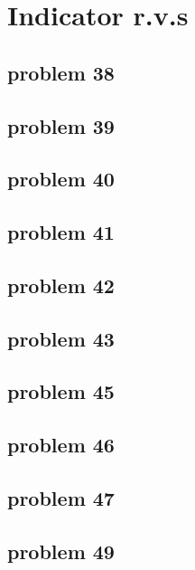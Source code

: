 \section{Indicator r.v.s}

\subsection{problem 38}


\subsection{problem 39}


\subsection{problem 40}


\subsection{problem 41}


\subsection{problem 42}


\subsection{problem 43}


\subsection{problem 45}


\subsection{problem 46}


\subsection{problem 47}


\subsection{problem 49}
